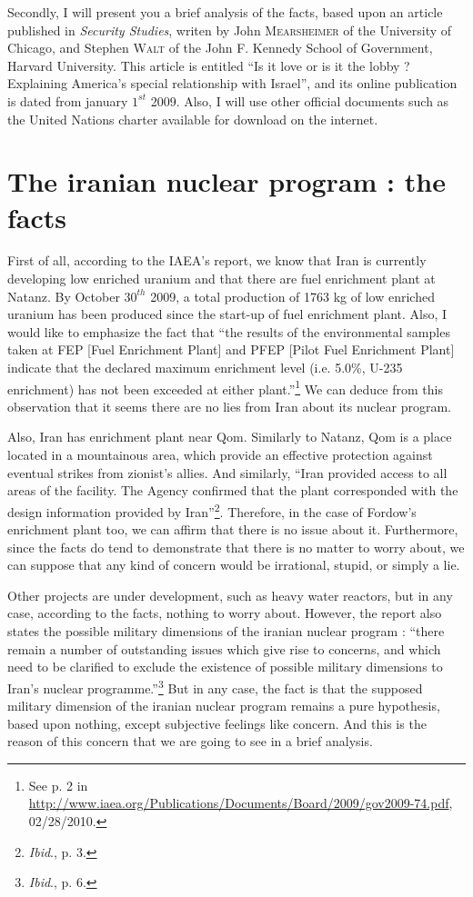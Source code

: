 \documentclass[10pt,a4paper]{scrartcl} %
\begin{document}
Secondly, I will present you a brief analysis of the facts, based upon an article published in \emph{Security Studies}, writen by John \textsc{Mearsheimer} of the University of Chicago, and Stephen \textsc{Walt} of the John F. Kennedy School of Government, Harvard University. This article is entitled \textquotedblleft Is it love or is it the lobby ? Explaining America's special relationship with Israel\textquotedblright, and its online publication is dated from january $1^{st}$ 2009. Also, I will use other official documents such as the United Nations charter available for download on the internet.

\section{The iranian nuclear program : the facts}

First of all, according to the IAEA's report, we know that Iran is currently developing low enriched uranium and that there are fuel enrichment plant at Natanz. By October $30^{th}$ 2009, a total production of 1763 kg of low enriched uranium has been produced since the start-up of fuel enrichment plant. Also, I would like to emphasize the fact that \textquotedblleft the results of the environmental samples taken at FEP [Fuel Enrichment Plant] and PFEP [Pilot Fuel Enrichment Plant] indicate that the declared maximum enrichment level (i.e. 5.0\%, U-235 enrichment) has not been exceeded at either plant.\textquotedblright\footnote{See p. 2 in \url{http://www.iaea.org/Publications/Documents/Board/2009/gov2009-74.pdf}, 02/28/2010.} We can deduce from this observation that it seems there are no lies from Iran about its nuclear program.

Also, Iran has enrichment plant near Qom. Similarly to Natanz, Qom is a place located in a mountainous area, which provide an effective protection against eventual strikes from zionist's allies. And similarly, \textquotedblleft Iran provided access to all areas of the facility. The Agency confirmed that the plant corresponded with the design information provided by Iran\textquotedblright\footnote{\emph{Ibid}., p. 3.}. Therefore, in the case of Fordow's enrichment plant too, we can affirm that there is no issue about it. Furthermore, since the facts do tend to demonstrate that there is no matter to worry about, we can suppose that any kind of concern would be irrational, stupid, or simply a lie.

Other projects are under development, such as heavy water reactors, but in any case, according to the facts, nothing to worry about. However, the report also states the possible military dimensions of the iranian nuclear program : \textquotedblleft there remain a number of outstanding issues which give rise to concerns, and which need to be clarified to exclude the existence of possible military dimensions to Iran's nuclear programme.\textquotedblright\footnote{\emph{Ibid}., p. 6.} But in any case, the fact is that the supposed military dimension of the iranian nuclear program remains a pure hypothesis, based upon nothing, except subjective feelings like concern. And this is the reason of this concern that we are going to see in a brief analysis.
\end{document}
